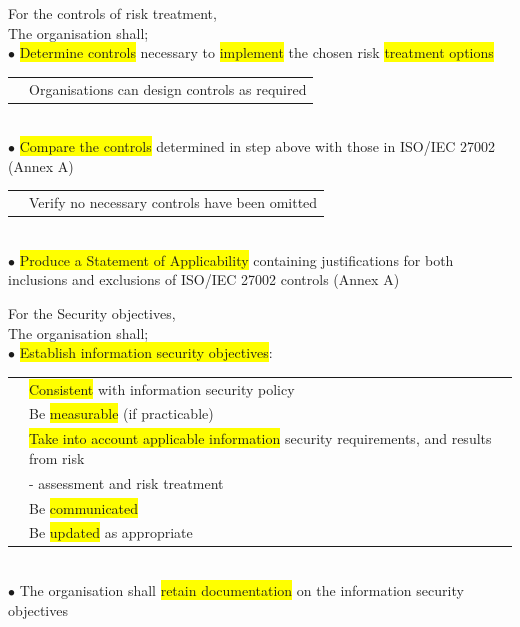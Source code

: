 \documentclass[tikz,border=10pt]{project_plan}
\newcommand{\bulletPoint}{\hspace{-3.1pt}$\bullet$ \hspace{5pt}}
\begin{document}
For the controls of risk treatment,\\
The organisation shall;\\
\bulletPoint \colorbox{yellow}{Determine controls} necessary to \colorbox{yellow}{implement} the chosen risk \colorbox{yellow}{treatment options}\\
\begin{tabular}{r |@{\bulletPoint} l}
   & Organisations can design controls as required \\
\end{tabular}\\
\bulletPoint \colorbox{yellow}{Compare the controls} determined in step above with those in ISO/IEC 27002 (Annex A) \\
\begin{tabular}{r |@{\bulletPoint} l}
   & Verify no necessary controls have been omitted \\
\end{tabular}\\
\bulletPoint \colorbox{yellow}{Produce a Statement of Applicability} containing justifications for both inclusions and exclusions of ISO/IEC 27002 controls (Annex A)

For the Security objectives,\\
The organisation shall;\\
\bulletPoint \colorbox{yellow}{Establish information security objectives}:\\
\begin{tabular}{r |@{\bulletPoint} l}
   & \colorbox{yellow}{Consistent} with information security policy                                           \\
   & Be \colorbox{yellow}{measurable} (if practicable)                                                        \\
   & \colorbox{yellow}{Take into account applicable information} security requirements, and results from risk \\& - assessment and risk treatment \\
   & Be \colorbox{yellow}{communicated}                                                                       \\
   & Be \colorbox{yellow}{updated} as appropriate                                                             \\
\end{tabular}\\
\bulletPoint The organisation shall \colorbox{yellow}{retain documentation} on the information security objectives
\end{document}
